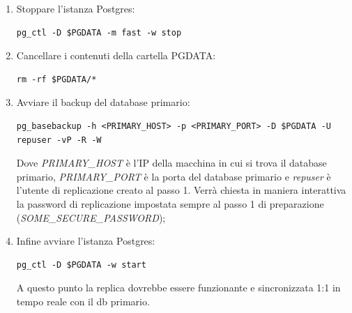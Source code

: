 \begin{enumerate}
  \item Stoppare l'istanza Postgres:
  \vspace{1mm}
\begin{lstlisting}[]
pg_ctl -D $PGDATA -m fast -w stop
\end{lstlisting}
  \item Cancellare i contenuti della cartella PGDATA:
  \vspace{1mm}
\begin{lstlisting}[]
rm -rf $PGDATA/*
\end{lstlisting}
  \item Avviare il backup del database primario:
  \vspace{1mm}
\begin{lstlisting}[]
pg_basebackup -h <PRIMARY_HOST> -p <PRIMARY_PORT> -D $PGDATA -U repuser -vP -R -W
\end{lstlisting}
Dove \textit{PRIMARY\_HOST} è l'IP della macchina in cui si trova il database primario, \textit{PRIMARY\_PORT} è la porta del database primario e \textit{repuser} è l'utente di replicazione creato al passo 1.
Verrà chiesta in maniera interattiva la password di replicazione impostata sempre al passo 1 di preparazione (\textit{SOME\_SECURE\_PASSWORD});
  \item Infine avviare l'istanza Postgres:
  \vspace{1mm}
\begin{lstlisting}[]
pg_ctl -D $PGDATA -w start
\end{lstlisting}
A questo punto la replica dovrebbe essere funzionante e sincronizzata 1:1 in tempo reale con il db primario.
\end{enumerate}

